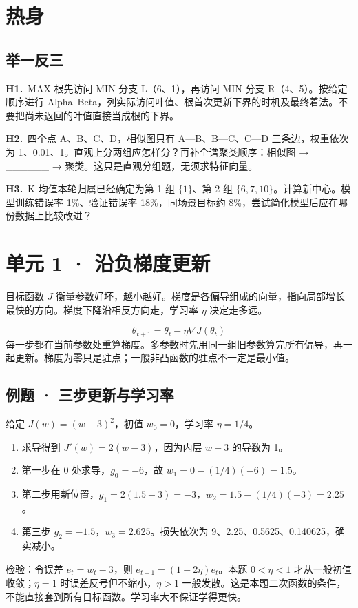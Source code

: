 \documentclass[UTF8,a4paper,11pt]{ctexart}
\newcommand{\CompactQuestion}[2]{\par\noindent\textbf{#1.}\ #2\par\vspace{.8em}}
\begin{document}
\section{热身}
\subsection{举一反三}
\CompactQuestion{H1}{MAX 根先访问 MIN 分支 L（6、1），再访问 MIN 分支 R（4、5）。按给定顺序进行 Alpha–Beta，列实际访问叶值、根首次更新下界的时机及最终着法。不要把尚未返回的叶值直接当成根的下界。}
\CompactQuestion{H2}{四个点 A、B、C、D，相似图只有 A—B、B—C、C—D 三条边，权重依次为 1、0.01、1。直观上分两组应怎样分？再补全谱聚类顺序：相似图 → \_\_\_\_\_\_ → 聚类。这只是直观分组题，无须求特征向量。}
\CompactQuestion{H3}{K 均值本轮归属已经确定为第 1 组 $\{1\}$、第 2 组 $\{6,7,10\}$。计算新中心。模型训练错误率 1\%、验证错误率 18\%，同场景目标约 8\%，尝试简化模型后应在哪份数据上比较改进？}
\clearpage
\section{单元 1 · 沿负梯度更新}
目标函数 $J$ 衡量参数好坏，越小越好。梯度是各偏导组成的向量，指向局部增长最快的方向。梯度下降沿相反方向走，学习率 $\eta$ 决定走多远。

\[\theta_{t+1}=\theta_t-\eta\nabla J(\theta_t)\]
每一步都在当前参数处重算梯度。多参数时先用同一组旧参数算完所有偏导，再一起更新。梯度为零只是驻点；一般非凸函数的驻点不一定是最小值。

\subsection{例题 · 三步更新与学习率}
给定 $J(w)=(w-3)^2$，初值 $w_0=0$，学习率 $\eta=1/4$。

\begin{enumerate}
\item 求导得到 $J'(w)=2(w-3)$，因为内层 $w-3$ 的导数为 1。
\item 第一步在 0 处求导，$g_0=-6$，故 $w_1=0-(1/4)(-6)=1.5$。
\item 第二步用新位置，$g_1=2(1.5-3)=-3$，$w_2=1.5-(1/4)(-3)=2.25$。
\item 第三步 $g_2=-1.5$，$w_3=2.625$。损失依次为 9、2.25、0.5625、0.140625，确实减小。
\end{enumerate}
检验：令误差 $e_t=w_t-3$，则 $e_{t+1}=(1-2\eta)e_t$。本题 $0<\eta<1$ 才从一般初值收敛；$\eta=1$ 时误差反号但不缩小，$\eta>1$ 一般发散。这是本题二次函数的条件，不能直接套到所有目标函数。学习率大不保证学得更快。
\end{document}
